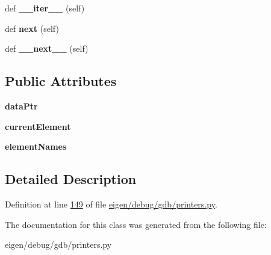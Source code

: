 \begin{DoxyCompactItemize}
def {\bfseries \+\_\+\+\_\+iter\+\_\+\+\_\+} (self)
\item 
\mbox{\label{classgdb_1_1printers_1_1_eigen_quaternion_printer_1_1__iterator_a3ce4510fa0717a0d5fbd647f7d2a1918}} 
def {\bfseries next} (self)
\item 
\mbox{\label{classgdb_1_1printers_1_1_eigen_quaternion_printer_1_1__iterator_a11d582280237f3ba949db06c283cbd4d}} 
def {\bfseries \+\_\+\+\_\+next\+\_\+\+\_\+} (self)
\end{DoxyCompactItemize}
\subsection*{Public Attributes}
\begin{DoxyCompactItemize}
\item 
\mbox{\label{classgdb_1_1printers_1_1_eigen_quaternion_printer_1_1__iterator_a5b6b06d61ff8013f66aec4f22c03ac89}} 
{\bfseries data\+Ptr}
\item 
\mbox{\label{classgdb_1_1printers_1_1_eigen_quaternion_printer_1_1__iterator_a3cd1bb196e9be9cd58a045da0a3686b1}} 
{\bfseries current\+Element}
\item 
\mbox{\label{classgdb_1_1printers_1_1_eigen_quaternion_printer_1_1__iterator_a84c39abaf18c7985b60eea277e77eda5}} 
{\bfseries element\+Names}
\end{DoxyCompactItemize}


\subsection{Detailed Description}


Definition at line \hyperlink{eigen_2debug_2gdb_2printers_8py_source_l00149}{149} of file \hyperlink{eigen_2debug_2gdb_2printers_8py_source}{eigen/debug/gdb/printers.\+py}.



The documentation for this class was generated from the following file\+:\begin{DoxyCompactItemize}
\item 
eigen/debug/gdb/printers.\+py\end{DoxyCompactItemize}
